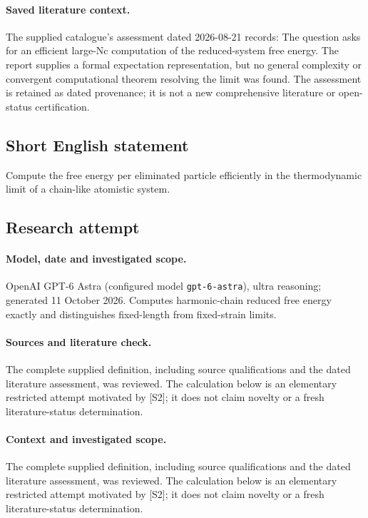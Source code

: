 \documentclass[11pt]{article}
\begin{document}
\paragraph{Saved literature context.} The supplied catalogue's assessment dated 2026-08-21 records: The question asks for an efficient large-Nc computation of the reduced-system free energy. The report supplies a formal expectation representation, but no general complexity or convergent computational theorem resolving the limit was found. The assessment is retained as dated provenance; it is not a new comprehensive literature or open-status certification.
\subsection{Short English statement}
Compute the free energy per eliminated particle efficiently in the thermodynamic limit of a chain-like atomistic system.
\subsection{Research attempt}
\paragraph{Model, date and investigated scope.}
OpenAI GPT-6 Astra (configured model \texttt{gpt-6-astra}), ultra reasoning; generated 11 October 2026. Computes harmonic-chain reduced free energy exactly and distinguishes fixed-length from fixed-strain limits.

\paragraph{Sources and literature check.}
The complete supplied definition, including source qualifications and the dated literature assessment, was reviewed. The calculation below is an elementary restricted attempt motivated by [S2]; it does not claim novelty or a fresh literature-status determination.

\paragraph{Context and investigated scope.} The complete supplied definition, including source qualifications and the dated literature assessment, was reviewed. The calculation below is an elementary restricted attempt motivated by [S2]; it does not claim novelty or a fresh literature-status determination.
\end{document}
